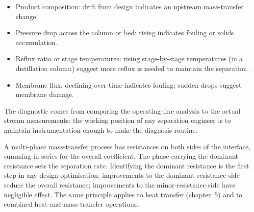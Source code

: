 \begin{itemize}[leftmargin=*]
  \item Product composition: drift from design indicates an upstream
    mass-transfer change.
  \item Pressure drop across the column or bed: rising indicates
    fouling or solids accumulation.
  \item Reflux ratio or stage temperatures: rising stage-by-stage
    temperatures (in a distillation column) suggest more reflux is
    needed to maintain the separation.
  \item Membrane flux: declining over time indicates fouling;
    sudden drops suggest membrane damage.
\end{itemize}

The diagnostic comes from comparing the operating-line analysis to
the actual stream measurements; the working position of any
separation engineer is to maintain instrumentation enough to make
the diagnosis routine.

\begin{principle}
A multi-phase mass-transfer process has resistances on both sides of
the interface, summing in series for the overall coefficient. The
phase carrying the dominant resistance sets the separation rate.
Identifying the dominant resistance is the first step in any design
optimisation: improvements to the dominant-resistance side reduce
the overall resistance; improvements to the minor-resistance side
have negligible effect. The same principle applies to heat
transfer (chapter~5) and to combined heat-and-mass-transfer
operations.
\end{principle}

